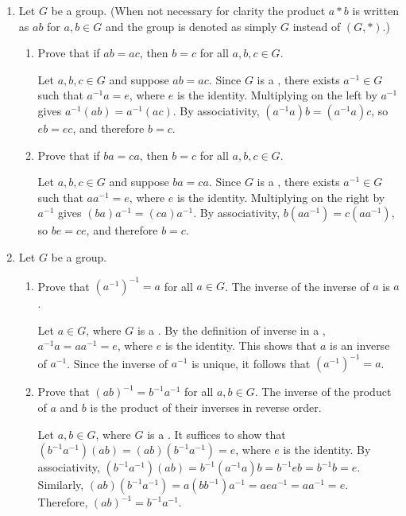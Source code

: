 \newpage
\begin{enumerate}
  \item Let \(G\) be a group.
  (When not necessary for clarity the product \(a * b\) is written as \(a b\) for \(a, b \in G\) and the group is denoted as simply \(G\) instead of \((G, *)\).)
  \begin{enumerate}
    \item Prove that if \(a b = a c\), then \(b = c\) for all \(a, b, c \in G\).
    \begin{subprove}
      Let \(a, b, c \in G\) and suppose \(a b = a c\).
      Since \(G\) is a , there exists \(a^{-1} \in G\) such that \(a^{-1} a = e\), where \(e\) is the identity.
      Multiplying on the left by \(a^{-1}\) gives \(a^{-1} (a b) = a^{-1} (a c)\).
      By associativity, \((a^{-1} a) b = (a^{-1} a) c\), so \(e b = e c\), and therefore \(b = c\).
    \end{subprove}
    \item Prove that if \(b a = c a\), then \(b = c\) for all \(a, b, c \in G\).
    \begin{subprove}
      Let \(a, b, c \in G\) and suppose \(b a = c a\).
      Since \(G\) is a , there exists \(a^{-1} \in G\) such that \(a a^{-1} = e\), where \(e\) is the identity.
      Multiplying on the right by \(a^{-1}\) gives \((b a) a^{-1} = (c a) a^{-1}\).
      By associativity, \(b (a a^{-1}) = c (a a^{-1})\), so \(b e = c e\), and therefore \(b = c\).
    \end{subprove}
  \end{enumerate}
  \item Let \(G\) be a group.
  \begin{enumerate}
    \item Prove that \(\left(a^{-1}\right)^{-1} = a\) for all \(a \in G\).
    The inverse of the inverse of \(a\) is \(a\).
    \begin{subprove}
      Let \(a \in G\), where \(G\) is a .
      By the definition of inverse in a , \(a^{-1} a = a a^{-1} = e\), where \(e\) is the identity.
      This shows that \(a\) is an inverse of \(a^{-1}\).
      Since the inverse of \(a^{-1}\) is unique, it follows that \(\left(a^{-1}\right)^{-1} = a\).
    \end{subprove}
    \item Prove that \((a b)^{-1} = b^{-1} a^{-1}\) for all \(a, b \in G\).
    The inverse of the product of \(a\) and \(b\) is the product of their inverses in reverse order.
    \begin{subprove}
      Let \(a, b \in G\), where \(G\) is a .
      It suffices to show that \((b^{-1} a^{-1}) (a b) = (a b) (b^{-1} a^{-1}) = e\), where \(e\) is the identity.
      By associativity, \((b^{-1} a^{-1}) (a b) = b^{-1} (a^{-1} a) b = b^{-1} e b = b^{-1} b = e\).
      Similarly, \((a b) (b^{-1} a^{-1}) = a (b b^{-1}) a^{-1} = a e a^{-1} = a a^{-1} = e\).
      Therefore, \((a b)^{-1} = b^{-1} a^{-1}\).
    \end{subprove}
  \end{enumerate}


\end{enumerate}
